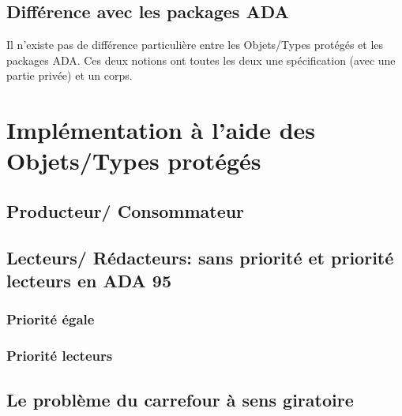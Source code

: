 \documentclass[11pt,a4paper]{article}
\begin{document}
\subsection{Différence avec les packages ADA}
Il n'existe pas de différence particulière entre les Objets/Types protégés et les packages ADA. Ces deux notions ont toutes les deux une spécification (avec une partie privée) et un corps.
\newpage
\section{Implémentation à l'aide des Objets/Types protégés}
\subsection{Producteur/ Consommateur}
\begin{scriptsize}
    
\end{scriptsize}
\newpage
\subsection{Lecteurs/ Rédacteurs: sans priorité et priorité lecteurs en ADA 95}
\subsubsection{Priorité égale}
\begin{scriptsize}
    
\end{scriptsize}
\newpage
\subsubsection{Priorité lecteurs}
\begin{scriptsize}
    
\end{scriptsize}
\newpage
\subsection{Le problème du carrefour à sens giratoire}
\begin{scriptsize}
    
\end{scriptsize}
\end{document}

